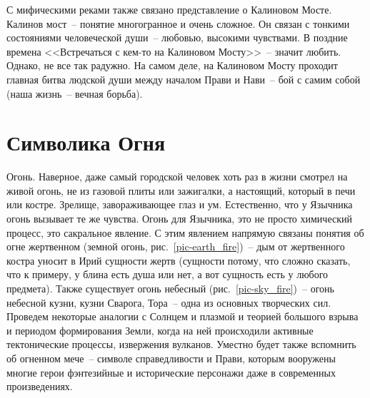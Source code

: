\documentclass[pscyr,titlepage,chapters]{hedreport}
\begin{document}
  С мифическими реками также связано представление о Калиновом Мосте. Калинов
  мост~-- понятие многогранное и очень сложное. Он связан с тонкими состояниями
  человеческой души~-- любовью, высокими чувствами. В поздние времена
  <<Встречаться с кем-то на Калиновом Мосту>>~-- значит любить. Однако, не все
  так радужно. На самом деле, на Калиновом Мосту проходит главная битва людской
  души между началом Прави и Нави~-- бой с самим собой (наша жизнь~-- вечная
  борьба).

  \chapter{Символика Огня}
  
  Огонь. Наверное, даже самый городской человек хоть раз в жизни смотрел на
  живой огонь, не из газовой плиты или зажигалки, а настоящий, который в печи
  или костре. Зрелище, завораживающее глаз и ум. Естественно, что у Язычника
  огонь вызывает те же чувства. Огонь для Язычника, это не просто химический
  процесс, это сакральное явление. С этим явлением напрямую связаны понятия об
  огне жертвенном (земной огонь, рис.~\ref{pic-earth_fire})~-- дым от
  жертвенного костра уносит в Ирий сущности жертв (сущности потому, что сложно
  сказать, что к примеру, у блина есть душа или нет, а вот сущность есть у
  любого предмета). Также существует огонь небесный (рис.~\ref{pic-sky_fire})~--
  огонь небесной кузни, кузни Сварога, Тора~-- одна из основных творческих сил.
  Проведем некоторые аналогии с Солнцем и плазмой и теорией большого взрыва и
  периодом формирования Земли, когда на ней происходили активные тектонические
  процессы, извержения вулканов. Уместно будет также вспомнить об огненном
  мече~-- символе справедливости и Прави, которым вооружены многие герои
  фэнтезийные и исторические персонажи даже в современных произведениях.
\end{document}
